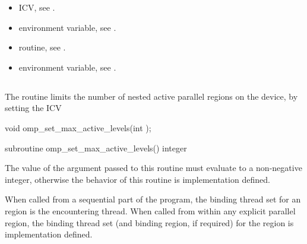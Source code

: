 \crossreferences
\begin{itemize}
\item {} ICV, see
.

\item {} environment variable, see
.

\item {} routine, see
.

\item {} environment variable, see
.

\end{itemize}









\subsection{}
\label{subsec:omp_set_max_active_levels}
\summary
The  routine limits the number of nested active
parallel regions on the device, by setting the  ICV


\format
\begin{ccppspecific}
\begin{ompcFunction}
void omp_set_max_active_levels(int );
\end{ompcFunction}
\end{ccppspecific}

\begin{fortranspecific}
\begin{ompfSubroutine}
subroutine omp_set_max_active_levels()
integer 
\end{ompfSubroutine}
\end{fortranspecific}

\constraints
The value of the argument passed to this routine must evaluate to a non-negative integer,
otherwise the behavior of this routine is implementation defined.

\binding
When called from a sequential part of the program, the binding thread set for an
 region is the encountering thread. When called
from within any explicit parallel region, the binding thread set (and binding region, if
required) for the  region is implementation defined.

